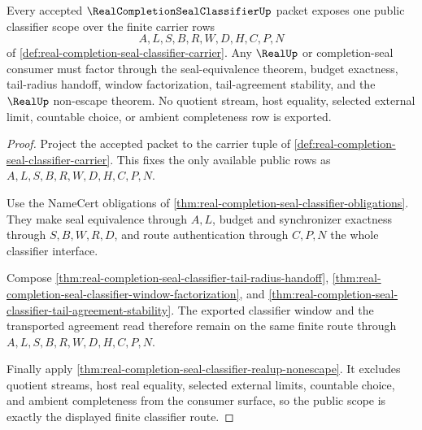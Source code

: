 \begin{theorem}
\label{thm:real-completion-seal-classifier-public-scope}
Every accepted $\RealCompletionSealClassifierUp$ packet exposes one public classifier scope over the finite carrier rows
$$
A,L,S,B,R,W,D,H,C,P,N
$$
of \autoref{def:real-completion-seal-classifier-carrier}. Any $\RealUp$ or completion-seal consumer must factor through the seal-equivalence theorem, budget exactness, tail-radius handoff, window factorization, tail-agreement stability, and the $\RealUp$ non-escape theorem. No quotient stream, host equality, selected external limit, countable choice, or ambient completeness row is exported.
\end{theorem}
\begin{proof}
Project the accepted packet to the carrier tuple of \autoref{def:real-completion-seal-classifier-carrier}. This fixes the only available public rows as $A,L,S,B,R,W,D,H,C,P,N$.

Use the NameCert obligations of \autoref{thm:real-completion-seal-classifier-obligations}. They make seal equivalence through $A,L$, budget and synchronizer exactness through $S,B,W,R,D$, and route authentication through $C,P,N$ the whole classifier interface.

Compose \autoref{thm:real-completion-seal-classifier-tail-radius-handoff}, \autoref{thm:real-completion-seal-classifier-window-factorization}, and \autoref{thm:real-completion-seal-classifier-tail-agreement-stability}. The exported classifier window and the transported agreement read therefore remain on the same finite route through $A,L,S,B,R,W,D,H,C,P,N$.

Finally apply \autoref{thm:real-completion-seal-classifier-realup-nonescape}. It excludes quotient streams, host real equality, selected external limits, countable choice, and ambient completeness from the consumer surface, so the public scope is exactly the displayed finite classifier route.
\end{proof}

